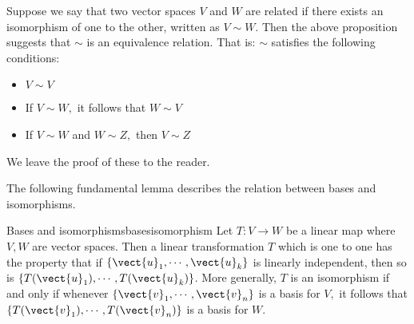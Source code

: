 Suppose we say that two vector spaces $V$ and $W$ are related if there exists an isomorphism of one to the other, written as $V\sim W$. 
Then the above proposition suggests that $\sim $ is an equivalence relation. That is: $\sim $
satisfies the following conditions:

\begin{itemize}
\item $V\sim V$

\item If $V\sim W,$ it follows that $W\sim V$

\item If $V\sim W$ and $W\sim Z,$ then $V\sim Z$
\end{itemize}

We leave the proof of these to the reader. 

The following fundamental lemma describes the relation between bases and
isomorphisms.

\begin{lemma}{Bases and isomorphisms}{basesisomorphism}
Let $T:V\rightarrow W$ be a
 linear map where $V,W$ are vector spaces.  Then a linear transformation $T$ which is one to one has the property that
if $\left\{ \vect{u}_{1},\cdots ,\vect{u}_{k}\right\} $ is linearly
independent, then so is $\left\{ T(\vect{u}_{1}),\cdots ,T(\vect{u}_{k})\right\} $.
 More generally, $T$ is an
isomorphism if and only if whenever $\left\{ 
\vect{v}_{1},\cdots ,\vect{v}_{n}\right\} $ is a basis for $V,$ it follows
that $\left\{ T(\vect{v}_{1}),\cdots ,T(\vect{v}_{n})\right\} $ is a basis for $W$.
\end{lemma}

